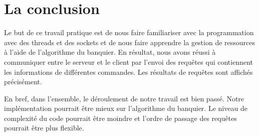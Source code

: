 \documentclass[11pt]{article}
\begin{document}
\section{La conclusion}
Le but de ce travail pratique est de nous faire familiariser avec la programmation avec des threads et des sockets et de nous faire apprendre la gestion de ressources à l'aide de l'algorithme du banquier. En résultat, nous avons réussi à communiquer entre le serveur et le client par l'envoi des requêtes qui contiennent les informations de différentes commandes. Les résultats de requêtes sont affichés précisément. 

En bref, dans l'ensemble, le déroulement de notre travail est bien passé. Notre implémentation pourrait être mieux sur l'algorithme du banquier. Le niveau de complexité du code pourrait être moindre et l'ordre de passage des requêtes pourrait être plus flexible.
\end{document}
